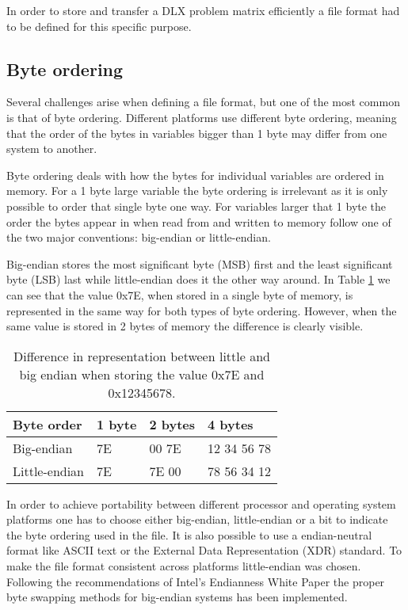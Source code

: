 In order to store and transfer a DLX problem matrix efficiently a file format had to be defined for this specific purpose.


\subsection{Byte ordering}

Several challenges arise when defining a file format, but one of the most common is that of byte ordering.
Different platforms use different byte ordering, meaning that the order of the bytes in variables bigger than 1 byte may differ from one system to another.

Byte ordering deals with how the bytes for individual variables are ordered in memory.
For a 1 byte large variable the byte ordering is irrelevant as it is only possible to order that single byte one way.
For variables larger that 1 byte the order the bytes appear in when read from and written to memory follow one of the two major conventions: big-endian or little-endian.

Big-endian stores the most significant byte (MSB) first and the least significant byte (LSB) last while little-endian does it the other way around.
In Table \ref{tab:endian} we can see that the value 0x7E, when stored in a single byte of memory, is represented in the same way for both types of byte ordering.
However, when the same value is stored in 2 bytes of memory the difference is clearly visible.

\begin{table}[htbp]
	\centering
	\begin{tabular}{|l||l|l||l|}
		\hline
		\bf Byte order & \bf 1 byte & \bf 2 bytes & \bf 4 bytes \\ \hline
		Big-endian    & 7E & 00 7E & 12 34 56 78 \\ \hline
		Little-endian & 7E & 7E 00 & 78 56 34 12 \\ \hline
	\end{tabular}
	\caption{Difference in representation between little and big endian when storing the value 0x7E and 0x12345678.}
	\label{tab:endian}
\end{table}

\noindent In order to achieve portability between different processor and operating system platforms one has to choose either big-endian, little-endian or a bit to indicate the byte ordering used in the file.
It is also possible to use a endian-neutral format like ASCII text or the External Data Representation (XDR) \cite{RFC4506} standard.
To make the file format consistent across platforms little-endian was chosen.
Following the recommendations of Intel's Endianness White Paper \cite{intel-endian} the proper byte swapping methods for big-endian systems has been implemented.


